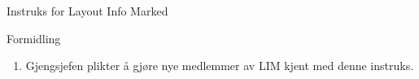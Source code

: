 \begin{instruks*}{Instruks for Layout Info Marked}
    \begin{instruksledd}{Formidling}
        \begin{enumerate}
            \item Gjengsjefen plikter å gjøre nye medlemmer av LIM kjent med denne instruks.
        \end{enumerate}
    \end{instruksledd}


\end{instruks*}


